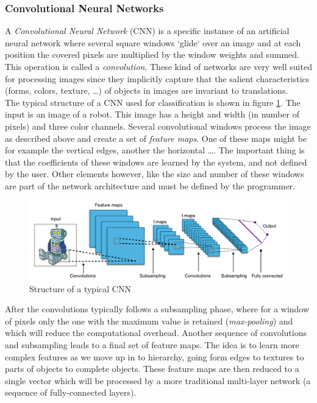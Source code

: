 \subsubsection{Convolutional Neural Networks}
A \emph{Convolutional Neural Network} (CNN) \cite{lecun1989backpropagation} is a specific instance of an artificial neural network where several square windows `glide` over an image and at each position the covered pixels are multiplied by the window weights and summed. This operation is called a \emph{convolution}. These kind of networks are very well suited for processing images since they implicitly capture that the salient characteristics (forms, colors, texture, \ldots) of objects in images are invariant to translations.\\
The typical structure of a CNN used for classification is shown in figure \ref{fig:typical_cnn}. The input is an image of a robot. This image has a height and width (in number of pixels) and three color channels. Several convolutional windows process the image as described above and create a set of \emph{feature maps}. One of these maps might be for example the vertical edges, another the horizontal \ldots. The important thing is that the coefficients of these windows are learned by the system, and not defined by the user. Other elements however, like the size and number of these windows are part of the network architecture and must be defined by the programmer. \\
\begin{figure}[htp]
    \centering
    \includegraphics[width=14cm]{images/typical_cnn.png}
    \caption{Structure of a typical CNN}
    \label{fig:typical_cnn}
\end{figure}
After the convolutions typically follows a subsampling phase, where for a window of pixels only the one with the maximum value is retained (\emph{max-pooling}) and which will reduce the computational overhead. Another sequence of convolutions and subsampling leads to a final set of feature maps. The idea is to learn more complex features as we move up in to hierarchy, going form edges to textures to parts of objects to complete objects. These feature maps are then reduced to a single vector which will be processed by a more traditional multi-layer network (a sequence of fully-connected layers).\\
